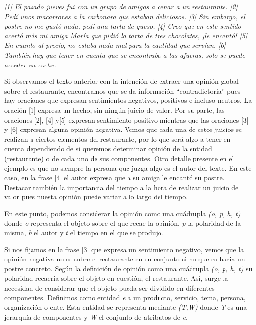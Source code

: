 			\begin{center}
			\begin{minipage}{0.9\linewidth}
				\vspace{5pt}%
				{\small
					\textit{[1] El pasado jueves fui con un grupo de amigos a cenar a un restaurante. [2] Pedí unos macarrones a la carbonara que estaban deliciosos. [3] Sin embargo, el postre no me gustó nada, pedí una tarta de queso. [4] Creo que en este sentido acertó más mi amiga María que pidió la tarta de tres chocolates, ¡le encantó! [5] En cuanto al precio, no estaba nada mal para la cantidad que servían. [6] También hay que  tener en cuenta que se encontraba a las afueras, solo se puede acceder en coche.}
				}
				\vspace{5pt}%
			\end{minipage}
		\end{center}
	

	Si observamos el texto anterior con la intención de extraer una opinión global sobre el restaurante, encontramos que se da información ``contradictoria'' pues hay oraciones que expresan sentimientos negativos, positivos e incluso neutros. La oración [1] expresa un hecho, sin ningún juicio de valor. Por su parte, las oraciones [2], [4] y[5] expresan sentimiento positivo mientras que las oraciones [3] y [6] expresan alguna opinión negativa. Vemos que cada una de estos juicios se realizan a ciertos elementos del restaurante, por lo que será algo a tener en cuenta dependiendo de si queremos determinar opinión de la entidad (restaurante) o de cada uno de sus componentes. Otro detalle presente en el ejemplo es que no siempre la persona que juzga algo es el autor del texto. En este caso, en la frase [4] el autor expresa que a su amiga le encantó su postre. Destacar también la importancia del tiempo a la hora de realizar un juicio de valor pues nuesta opinión puede variar a lo largo del tiempo. 
	
	En este punto, podemos considerar la opinión como una cuádrupla \textit{(o, p, h, t)} donde \textit{o} representa el objeto sobre el que recae la opinión, \textit{p} la polaridad de la misma, \textit{h} el autor y \textit{t} el tiempo en el que se produjo.
	
	Si nos fijamos en la frase [3] que expresa un sentimiento negativo, vemos que la opinión negativa no es sobre el restaurante en su conjunto si no que  es hacia un postre concreto. Según la definición de opinión como una cuádrupla \textit{(o, p, h, t)} su polaridad recaería sobre el objeto en cuestión, el restaurante. Así, surge la necesidad de considerar que el objeto pueda ser dividido en diferentes componentes. Definimos como entidad \textit{e} a un producto, servicio, tema, persona, organización o ente. Esta entidad se representa mediante \textit{(T,W)} donde \textit{T} es una jerarquía de componentes y \textit{W} el conjunto de atributos de \textit{e}. 
	
